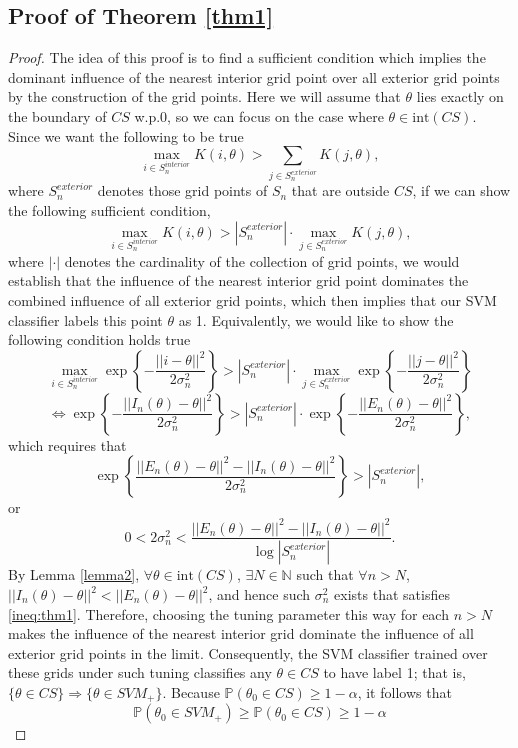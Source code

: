 \documentclass[12pt]{article}
\theoremstyle{definition}
\begin{document}
\begin{appendices}
\subsection{Proof of Theorem \ref{thm1}}
\begin{proof}
The idea of this proof is to find a sufficient condition which implies the dominant influence of the nearest interior grid point over all exterior grid points by the construction of the grid points. Here we will assume that $\theta$ lies exactly on the boundary of $CS$ w.p.0, so we can focus on the case where $\theta\in\text{int}(CS)$. Since we want the following to be true 
$$\max_{i\in S_{n}^{interior}} K(i,\theta)>\sum_{j\in S_{n}^{exterior}}K(j,\theta),$$
where $S_n^{exterior}$ denotes those grid points of $S_n$ that are outside $CS$, if we can show the following sufficient condition, 
$$\max_{i\in S_{n}^{interior}} K(i,\theta)>|S_n^{exterior}|\cdot\max_{j\in S_{n}^{exterior}}K(j,\theta),$$
where $|\cdot|$ denotes the cardinality of the collection of grid points, we would establish that the influence of the nearest interior grid point dominates the combined influence of all exterior grid points, which then implies that our SVM classifier labels this point $\theta$ as 1. Equivalently, we would like to show the following condition holds true
$$\max_{i\in S_{n}^{interior}}\exp\left\{-\frac{||i-\theta||^2}{2\sigma_n^2}\right\} > |S_n^{exterior}|\cdot\max_{j\in S_{n}^{exterior}}\exp\left\{-\frac{||j-\theta||^2}{2\sigma_n^2}\right\}$$
$$\Leftrightarrow \exp\left\{-\frac{||I_n(\theta)-\theta||^2}{2\sigma_n^2}\right\}>|S_n^{exterior}|\cdot\exp\left\{-\frac{||E_n(\theta)-\theta||^2}{2\sigma_n^2}\right\},$$
which requires that 
$$\exp\left\{\frac{||E_n(\theta)-\theta||^2-||I_n(\theta)-\theta||^2}{2\sigma_n^2}\right\}>|S_n^{exterior}|,$$
or 
\begin{equation}\label{ineq:thm1}
0<2\sigma_n^2<\frac{||E_n(\theta)-\theta||^2-||I_n(\theta)-\theta||^2}{\log|S_n^{exterior}|}.
\end{equation}
By Lemma \ref{lemma2}, $\forall\theta\in \text{int}(CS)$, $\exists N\in\mathbb{N}$ such that $\forall n>N$, $||I_n(\theta)-\theta||^2<||E_n(\theta)-\theta||^2$, and hence such $\sigma_n^2$ exists that satisfies \ref{ineq:thm1}. Therefore, choosing the tuning parameter this way for each $n>N$ makes the influence of the nearest interior grid dominate the influence of all exterior grid points in the limit. Consequently, the SVM classifier trained over these grids under such tuning classifies any $\theta\in CS$ to have label 1; that is, $\{\theta\in CS\} \Rightarrow \{\theta\in SVM_+\}$. Because $\mathbb{P}(\theta_0\in CS)\geq 1-\alpha$, it follows that
$$\mathbb{P}(\theta_0\in SVM_+)\geq \mathbb{P}(\theta_0\in CS)\geq 1-\alpha$$
\end{proof}



\end{appendices}
\end{document}
